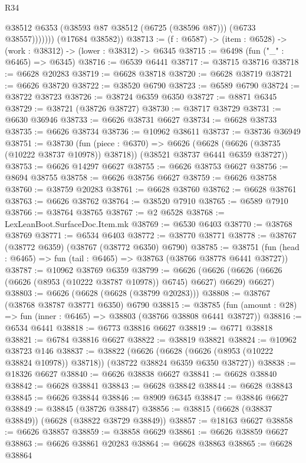 \begin{lexlean}{R34}
\begin{coremodule}
                  @38512
                  @6353
                  (@38593 @87 @38512 (@6725 (@38596 @87)))
                  (@6733 @38557)))))))
      (@17684 @38582))
@38713 := (f : @6587) -> (item : @6528) -> (work : @38312) -> (lower : @38312) -> @6345
@38715 := @6498 (fun ("_" : @6465) => @6345)
@38716 := @6539 @6441
@38717 := @38715 @38716
@38718 := @6628 @20283
@38719 := @6628 @38718
@38720 := @6628 @38719
@38721 := @6626 @38720
@38722 := @38520 @6790
@38723 := @6589 @6790
@38724 := @38722 @38723
@38726 := @38724 @6359 @6350
@38727 := @8871 @6345
@38729 := @38721 (@38726 @38727)
@38730 := @38717 @38729
@38731 := @6630 @36946
@38733 := @6626 @38731 @6627
@38734 := @6628 @38733
@38735 := @6626 @38734
@38736 := @10962 @38611
@38737 := @38736 @36949
@38751 := @38730
    (fun (piece : @6370) =>
    @6626 (@6628 (@6626 (@38735 (@10222 @38737 @10978)) @38718)) (@38521 @38737 @6441 @6359 @38727))
@38753 := @6626 @14297 @6627
@38755 := @6626 @38753 @6627
@38756 := @8694 @38755
@38758 := @6626 @38756 @6627
@38759 := @6626 @38758
@38760 := @38759 @20283
@38761 := @6628 @38760
@38762 := @6628 @38761
@38763 := @6626 @38762
@38764 := @38520 @7910
@38765 := @6589 @7910
@38766 := @38764 @38765
@38767 := @2 @6528
@38768 := LexLeanBoot.SurfaceDoc.Item.mk
@38769 := @6530 @6403
@38770 := @38768 @38769
@38771 := @6534 @6403
@38772 := @38770 @38771
@38778 := @38767 (@38772 @6359) (@38767 (@38772 @6350) @6790)
@38785 := @38751 (fun (head : @6465) => fun (tail : @6465) => @38763 (@38766 @38778 @6441 @38727))
@38787 := @10962 @38769 @6359
@38799 := @6626
    (@6626 (@6626 (@6626 (@6626 (@8953 (@10222 @38787 @10978)) @6745) @6627) @6629) @6627)
@38803 := @6626 (@6628 (@6628 (@38799 @20283)))
@38808 := @38767 (@38768 @38787 @38771 @6350) @6790
@38815 := @38785 (fun (amount : @28) => fun (inner : @6465) => @38803 (@38766 @38808 @6441 @38727))
@38816 := @6534 @6441
@38818 := @6773 @38816 @6627
@38819 := @6771 @38818
@38821 := @6784 @38816 @6627
@38822 := @38819 @38821
@38824 := @10962 @38723 @146
@38837 := @38822
    (@6626 (@6628 (@6626 (@8953 (@10222 @38824 @10978)) @38718)) (@38722 @38824 @6359 @6350 @38727))
@38838 := @18326 @6627
@38840 := @6626 @38838 @6627
@38841 := @6628 @38840
@38842 := @6628 @38841
@38843 := @6628 @38842
@38844 := @6628 @38843
@38845 := @6626 @38844
@38846 := @8909 @6345
@38847 := @38846 @6627
@38849 := @38845 (@38726 @38847)
@38856 := @38815 (@6628 (@38837 @38849)) (@6628 (@38822 @38729 @38849))
@38857 := @18163 @6627
@38858 := @6626 @38857
@38859 := @38858 @6629
@38861 := @6626 @38859 @6627
@38863 := @6626 @38861 @20283
@38864 := @6628 @38863
@38865 := @6628 @38864

\end{coremodule}
\end{lexlean}
